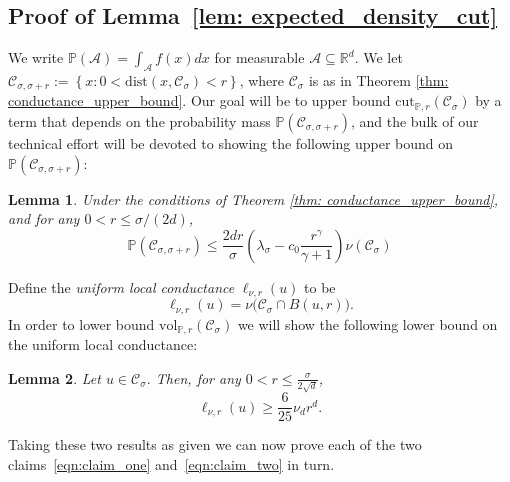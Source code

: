 \documentclass[11pt,twoside]{article}
\newtheorem{lemma}{Lemma}
\theoremstyle{definition}
\newcommand{\set}[1]{\left\{#1\right\}}
\newcommand{\vol}{\mathrm{vol}}
\newcommand{\cut}{\mathrm{cut}}
\newcommand{\Reals}{\mathbb{R}}
\newcommand{\Rd}{\Reals^d}
\newcommand{\1}{\mathbbm{1}}
\newcommand{\dist}{\mathrm{dist}}
\newcommand{\Xbf}{X}
\newcommand{\Pbb}{\mathbb{P}}
\newcommand{\Cset}{\mathcal{C}}
\newcommand{\Aset}{\mathcal{A}}
\newcommand{\Csig}{\Cset_{\sigma}}
\newcommand{\Csigr}{\Cset_{\sigma,\sigma + r}}
\begin{document}
\subsection{Proof of Lemma~\ref{lem: expected_density_cut}}
We write $\Pbb(\Aset) = \int_{\Aset} f(x) dx$ for measurable $\Aset \subseteq \Rd$.
We 
let $\Csigr := \set{x: 0 < \dist(x, \Csig) < r}$, where $\Csig$ is as in Theorem \ref{thm: conductance_upper_bound}. 
Our goal will be to upper bound $\cut_{\Pbb,r}(\Csig)$ by a term that depends on the probability mass $\Pbb(\Csigr)$, 
and the bulk of our technical effort will be devoted to showing the following upper bound on $\Pbb(\Csigr)$:
\begin{lemma}
	\label{lem: expected_number_boundary_points}
	Under the conditions of Theorem \ref{thm: conductance_upper_bound}, and for any $0 < r \leq \sigma/(2d)$,
	\begin{equation*}
	\Pbb(\Csigr) \leq \frac{2dr}{\sigma} \left(\lambda_{\sigma} - c_0\frac{r^{\gamma}}{\gamma + 1}\right) \nu(\Csig)
	\end{equation*}	
\end{lemma}
\noindent Define the \emph{uniform local conductance} $\ell_{\nu,r}(u)$ to be
\begin{equation*}
\ell_{\nu,r}(u) = \nu\bigl(\Csig \cap B(u,r)\bigr).
\end{equation*}
In order to lower bound $\vol_{\Pbb,r}(\Csig)$ we will show the following lower bound on the uniform local conductance:
\begin{lemma}
	\label{lem: local_conductance}
	Let $u \in \Csig$. Then, for any $0 < r \leq \frac{\sigma}{2\sqrt{d}}$,
	\begin{equation*}
	\ell_{\nu,r}(u) \geq \frac{6}{25} \nu_d r^d.
	\end{equation*}
\end{lemma}
Taking these two results as given we can now prove each of the two claims~\eqref{eqn:claim_one} and~\eqref{eqn:claim_two} in turn.
\end{document}
